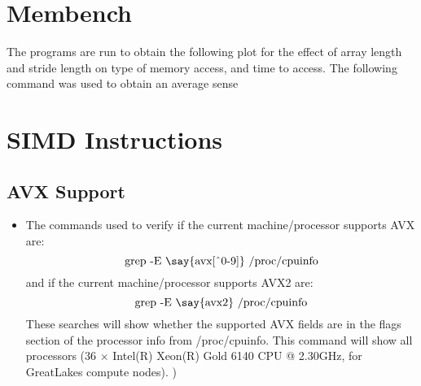\documentclass[letterpaper]{article}
\title{\Large\doctitle}
\author{\docauthor}
\affil{\docaffil}
\date{\today}%
\begin{document}
\maketitle
\pagestyle{fancy}




\section{Membench}
The  programs are run to obtain the following plot for the effect of array length and stride length on type of memory access, and time to access. The following command was used to obtain an average sense


\section{SIMD Instructions}

\subsection{AVX Support}
\begin{itemize}
	\item The commands used to verify if the current machine/processor supports AVX are:
	$$ \textrm{grep -E \say{avx[\^{}0-9]} /proc/cpuinfo}$$
	and if the current machine/processor supports AVX2 are:
	$$ \textrm{grep -E \say{avx2} /proc/cpuinfo}$$
	These searches will show whether the supported AVX fields are in the flags section of the processor info from /proc/cpuinfo. This command will show all processors (36 $\times$ Intel(R) Xeon(R) Gold 6140 CPU @ 2.30GHz, for GreatLakes compute nodes).
)


\end{itemize}




\end{document}
